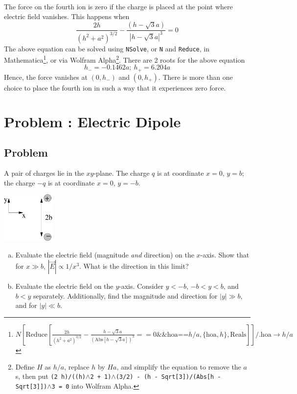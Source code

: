 \documentclass[solutions]{esg8022pset}
\begin{document}
  The force on the fourth ion is zero if the charge is placed at the point where electric field vanishes. This happens when
  \begin{equation*}
    \frac{2h}{(h^2 + a^2)^{3/2}} - \frac{(h - \sqrt3 a)}{|h - \sqrt3 a|^3} = 0
  \end{equation*}
  The above equation can be solved using \texttt{NSolve}, or \texttt{N} and \texttt{Reduce}, in Mathematica\footnote{$N\left[\text{Reduce}\left[\frac{2 h}{\left(h^2+a^2\right)^{3/2}}-\frac{h-\sqrt{3}a}{\left(\text{Abs}\left[h-\sqrt{3}a\right]\right)^3}==0\&\&\text{hoa}\text{==}h/ a,\{\text{hoa},h\},\text{Reals}\right]\right]\text{/.}\text{hoa}\to h/a$}, or via Wolfram Alpha\footnote{Define $H$ as $h / a$, replace $h$ by $H a$, and simplify the equation to remove the $a$s, then put \texttt{(2 h)/((h)$\wedge$2 + 1)$\wedge$(3/2) - (h - Sqrt[3])/(Abs[h - Sqrt[3]])$\wedge$3 = 0} into Wolfram Alpha.}. There are 2 roots for the above equation
  $$h_- = -0.1462a;\ h_+ = 6.204a$$
  Hence, the force vanishes at $(0, h_-)$ and $(0, h_+)$. There is more than one choice to place the fourth ion in such a way that it experiences zero force.
\section{Problem \thesection: Electric Dipole}
\subsection{Problem}
  A pair of charges lie in the $xy$-plane.  The charge $q$ is at coordinate $x = 0$, $y = b$; the charge $-q$ is at coordinate $x = 0$, $y = -b$.
  \begin{center}\includegraphics[width=0.2\textwidth]{ps01_8}\end{center}
  \begin{enumerate}[(a)]
    \item Evaluate the electric field (magnitude \emph{and} direction) on the $x$-axis.  Show that for $x \gg b$, $|\vec E| \propto 1 / x^3$.  What is the direction in this limit?
    \item Evaluate the electric field on the $y$-axis.  Consider $y < -b$, $-b < y < b$, and $b < y$ separately.  Additionally, find the magnitude and direction for $|y| \gg b$, and for $|y| \ll b$.
  \end{enumerate}
\end{document}
